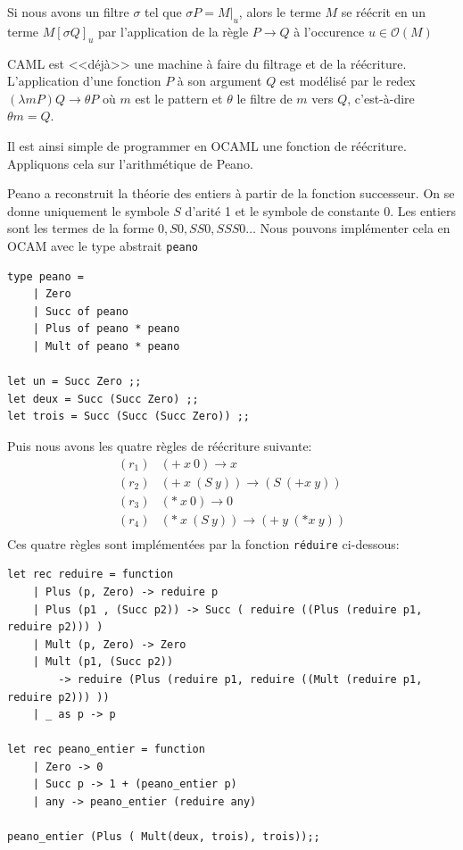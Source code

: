 \documentclass[11pt]{book}
\begin{document}
Si nous avons un filtre $\sigma$ tel que $\sigma P = M|_u$, alors le terme $M$ se 
réécrit en un terme $M[\sigma Q]_u$ par l'application de la règle $P \longrightarrow Q$ 
à l'occurence $u \in \mathcal{O}(M)$  
\begin{center}
\end{center}

CAML est <<déjà>> une machine à faire du filtrage et de la réécriture. 
L'application d'une fonction $P$ à son argument $Q$ est modélisé par le redex
$(\lambda m P)Q \longrightarrow \theta P$ où $m$ est le pattern et $\theta$ le filtre de
$m$ vers $Q$, c'est-à-dire $\theta m = Q$.	


Il est ainsi simple de programmer en OCAML une fonction de réécriture.
Appliquons cela sur l'arithmétique de Peano.

Peano a reconstruit la théorie des
entiers à partir de la fonction successeur. On se donne uniquement le symbole
$S$ d'arité 1 et le symbole de constante 0.
Les entiers sont les termes de la forme $0, S0, SS0, SSS0 \ldots$
Nous pouvons implémenter cela en OCAM avec le type abstrait \verb+peano+
\begin{Verbatim}
type peano = 
	| Zero
	| Succ of peano
	| Plus of peano * peano
	| Mult of peano * peano

let un = Succ Zero ;;
let deux = Succ (Succ Zero) ;;
let trois = Succ (Succ (Succ Zero)) ;;
\end{Verbatim}

Puis nous avons les quatre règles de réécriture suivante:
$$
\begin{array}{ll}
(r_1) & (+\ x\ 0) \rightarrow x \\
(r_2) & (+\  x\ (S\ y)) \to (S\ (+x\ y)) \\
(r_3) & (*\ x\ 0) \to 0 \\
(r_4) & (*\ x\ (S\ y)) \to (+\ y\ (* x\ y)) \\
\end{array}
$$
Ces quatre règles sont implémentées par la fonction \verb+réduire+ ci-dessous:
\begin{Verbatim}
let rec reduire = function
	| Plus (p, Zero) -> reduire p
	| Plus (p1 , (Succ p2)) -> Succ ( reduire ((Plus (reduire p1, reduire p2))) )
	| Mult (p, Zero) -> Zero
	| Mult (p1, (Succ p2)) 
	    -> reduire (Plus (reduire p1, reduire ((Mult (reduire p1, reduire p2))) ))
	| _ as p -> p 

let rec peano_entier = function
	| Zero -> 0
	| Succ p -> 1 + (peano_entier p)
	| any -> peano_entier (reduire any)
	
peano_entier (Plus ( Mult(deux, trois), trois));;
\end{Verbatim}
\end{document}
